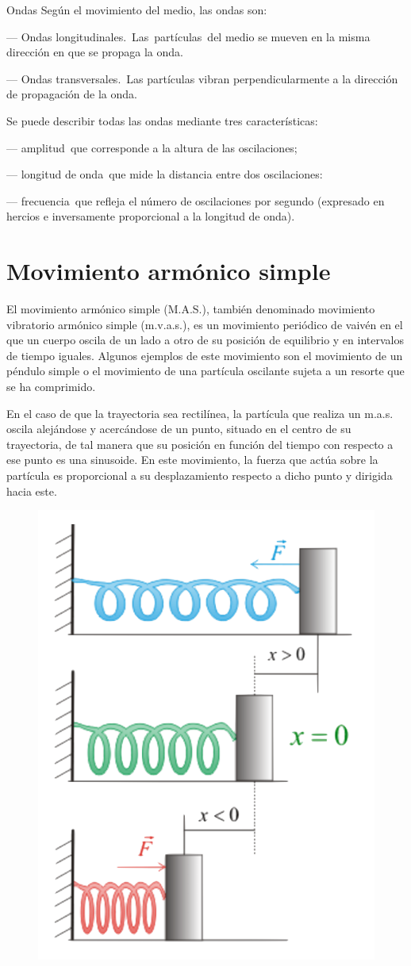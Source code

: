 \begin{myalertblock}{Ondas}
Según el movimiento del medio, las ondas son:

--- Ondas longitudinales. Las partículas del medio se mueven en la misma dirección en que se propaga la onda.

--- Ondas transversales. Las partículas vibran perpendicularmente a la dirección de propagación de la onda.


\vspace{2mm} Se puede describir todas las ondas mediante tres características:

--- amplitud que corresponde a la altura de las oscilaciones;

--- longitud de onda que mide la distancia entre dos oscilaciones:

--- frecuencia que refleja el número de oscilaciones por segundo (expresado en hercios e inversamente proporcional a la longitud de onda).
\end{myalertblock}

\chapter{Movimiento armónico simple}

\vspace{-5mm} %
\begin{miparrafo}
\small{El movimiento armónico simple (M.A.S.), también denominado movimiento vibratorio armónico simple (m.v.a.s.), es un movimiento periódico de vaivén en el que un cuerpo oscila de un lado a otro de su posición de equilibrio y en intervalos de tiempo iguales. Algunos ejemplos de este movimiento son el movimiento de un péndulo simple o el movimiento de una partícula oscilante sujeta a un resorte que se ha comprimido.}

\begin{multicols}{2}
\small{En el caso de que la trayectoria sea rectilínea, la partícula que realiza un m.a.s. oscila alejándose y acercándose de un punto, situado en el centro de su trayectoria, de tal manera que su posición en función del tiempo con respecto a ese punto es una sinusoide. En este movimiento, la fuerza que actúa sobre la partícula es proporcional a su desplazamiento respecto a dicho punto y dirigida hacia este.	}
\begin{figure}[H]
		\centering
		\includegraphics[width=.4\textwidth]{imagenes/imagenes19/T19IM02.png}
	\end{figure}
\end{multicols}
\end{miparrafo}


